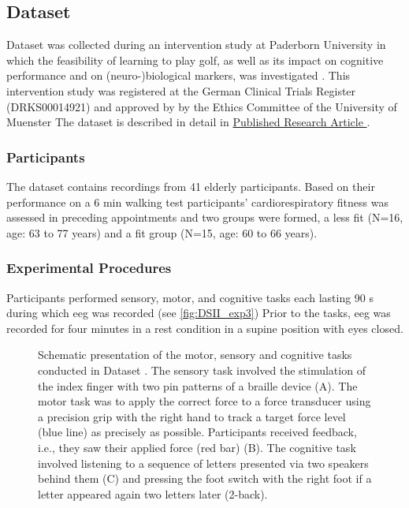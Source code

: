 \subsection{Dataset }
\label{methods:datasets:III}
Dataset  was collected during an intervention study at Paderborn University in which the feasibility of learning to play golf, as well as its impact on cognitive performance and on (neuro-)biological markers, was investigated \cite{Ströhlein2020,Stroehlein2021,Gowik2023}. This intervention study was registered at the German Clinical Trials Register (DRKS00014921) and approved by by the Ethics Committee of the University of Muenster The dataset is described in detail in \hyperref[pub:paperIII]{Published Research Article }. 

\subsubsection{Participants}
\label{methods:datasets:III:participants}
The dataset contains recordings from 41 elderly participants. Based on their performance on a 6 min walking test participants’ cardiorespiratory fitness was assessed in preceding appointments and two groups were formed, a less fit (N=16, age: 63 to 77 years) and a fit group (N=15, age: 60 to 66 years).

\subsubsection{Experimental Procedures}
\label{methods:datasets:II:experiment}
Participants performed sensory, motor, and cognitive tasks each lasting 90 s during which \gls{eeg} was recorded (see \autoref{fig:DSII_exp3}) Prior to the tasks, \gls{eeg} was recorded for four minutes in a rest condition in a supine position with eyes closed.

\begin{figure}[h]
\begin{center}

\caption[Schematic presentation of the motor, sensory and cognitive tasks conducted in Dataset .]{Schematic presentation of the motor, sensory and cognitive tasks conducted in Dataset . The sensory task involved the stimulation of the index finger with two pin patterns of a braille device (A). The motor task was to apply the correct force to a force transducer using a precision grip with the right hand to track a target force level (blue line) as precisely as possible. Participants received feedback, i.e., they saw their applied force (red bar) (B). The cognitive task involved listening to a sequence of letters presented via two speakers behind them (C) and pressing the foot switch with the right foot if a letter appeared again two letters later (2-back).}
\label{fig:DSII_exp3}
\end{center}
\end{figure}

